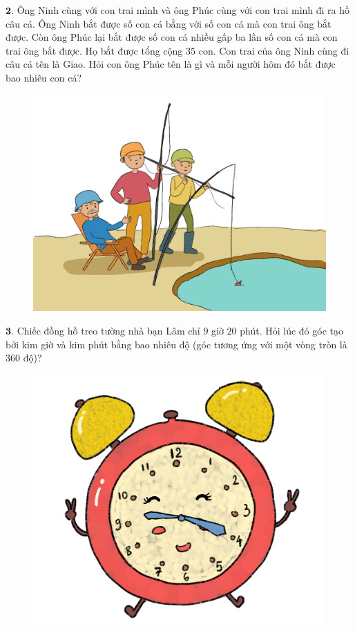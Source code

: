 	\begin{multicols}{2}
	$\pmb{2.}$ Ông Ninh cùng với con trai mình và ông Phúc cùng với con trai mình đi ra hồ câu cá. Ông Ninh bắt được số con cá bằng với số con cá mà con trai ông  bắt được. Còn ông Phúc lại bắt được số con cá nhiều gấp ba lần số con cá mà con trai ông bắt được. Họ bắt được tổng cộng  $35$ con. Con trai của ông Ninh cùng đi câu cá tên là Giao. Hỏi con ông Phúc tên là gì và mỗi người hôm đó bắt được bao nhiêu con cá?
	\begin{figure}[H]
		\centering
		\vspace*{-5pt}
		\captionsetup{labelformat= empty, justification=centering}
		\includegraphics[width=1\linewidth]{bai2}
		\vspace*{-15pt}
	\end{figure}
	$\pmb{3.}$ Chiếc đồng hồ treo tường nhà bạn Lâm chỉ  $9$ giờ $20$ phút. Hỏi lúc đó góc tạo bởi kim giờ và kim phút bằng bao nhiêu độ (góc tương ứng với một vòng tròn là $360$ độ)?
	\begin{figure}[H]
		\centering
		\vspace*{-5pt}
		\captionsetup{labelformat= empty, justification=centering}
		\includegraphics[width=1\linewidth]{bai3}

\end{figure}
\end{multicols}
